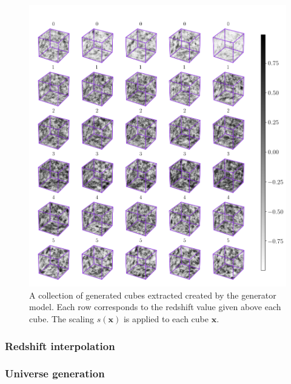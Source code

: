 \documentclass[twocolumn]{article}
\numberwithin{equation}{section}
\begin{document}
\begin{figure}[hbt!]
\includegraphics[width=15cm]{figures/cubes/g_classes3d.png}
\centering
\caption{A collection of generated cubes extracted created by the generator model. Each row corresponds to the 
         redshift value given above each cube. The scaling $s(\mathbf{x})$ is applied to each cube $\mathbf{x}$.}
\label{fig:g_z_imgs}
\end{figure}



\subsubsection{Redshift interpolation}

\subsubsection{Universe generation}
\end{document}

